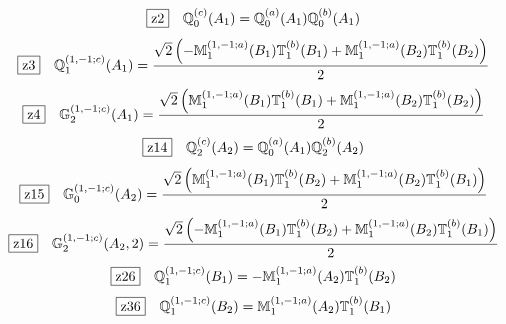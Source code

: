 \documentclass[fleqn,10pt,landscape]{jsarticle}
\begin{document}
\begin{dmath*}
\hspace*{3mm}\fbox{z2}\quad \mathbb{Q}_{0}^{(c)}(A_{1})=\mathbb{Q}_{0}^{(a)}(A_{1}) \mathbb{Q}_{0}^{(b)}(A_{1})
\end{dmath*}
\begin{dmath*}
\hspace*{3mm}\fbox{z3}\quad \mathbb{Q}_{1}^{(1,-1;c)}(A_{1})=\frac{\sqrt{2} \left(- \mathbb{M}_{1}^{(1,-1;a)}(B_{1}) \mathbb{T}_{1}^{(b)}(B_{1}) + \mathbb{M}_{1}^{(1,-1;a)}(B_{2}) \mathbb{T}_{1}^{(b)}(B_{2})\right)}{2}
\end{dmath*}
\begin{dmath*}
\hspace*{3mm}\fbox{z4}\quad \mathbb{G}_{2}^{(1,-1;c)}(A_{1})=\frac{\sqrt{2} \left(\mathbb{M}_{1}^{(1,-1;a)}(B_{1}) \mathbb{T}_{1}^{(b)}(B_{1}) + \mathbb{M}_{1}^{(1,-1;a)}(B_{2}) \mathbb{T}_{1}^{(b)}(B_{2})\right)}{2}
\end{dmath*}
\begin{dmath*}
\hspace*{3mm}\fbox{z14}\quad \mathbb{Q}_{2}^{(c)}(A_{2})=\mathbb{Q}_{0}^{(a)}(A_{1}) \mathbb{Q}_{2}^{(b)}(A_{2})
\end{dmath*}
\begin{dmath*}
\hspace*{3mm}\fbox{z15}\quad \mathbb{G}_{0}^{(1,-1;c)}(A_{2})=\frac{\sqrt{2} \left(\mathbb{M}_{1}^{(1,-1;a)}(B_{1}) \mathbb{T}_{1}^{(b)}(B_{2}) + \mathbb{M}_{1}^{(1,-1;a)}(B_{2}) \mathbb{T}_{1}^{(b)}(B_{1})\right)}{2}
\end{dmath*}
\begin{dmath*}
\hspace*{3mm}\fbox{z16}\quad \mathbb{G}_{2}^{(1,-1;c)}(A_{2},2)=\frac{\sqrt{2} \left(- \mathbb{M}_{1}^{(1,-1;a)}(B_{1}) \mathbb{T}_{1}^{(b)}(B_{2}) + \mathbb{M}_{1}^{(1,-1;a)}(B_{2}) \mathbb{T}_{1}^{(b)}(B_{1})\right)}{2}
\end{dmath*}
\begin{dmath*}
\hspace*{3mm}\fbox{z26}\quad \mathbb{Q}_{1}^{(1,-1;c)}(B_{1})=- \mathbb{M}_{1}^{(1,-1;a)}(A_{2}) \mathbb{T}_{1}^{(b)}(B_{2})
\end{dmath*}
\begin{dmath*}
\hspace*{3mm}\fbox{z36}\quad \mathbb{Q}_{1}^{(1,-1;c)}(B_{2})=\mathbb{M}_{1}^{(1,-1;a)}(A_{2}) \mathbb{T}_{1}^{(b)}(B_{1})
\end{dmath*}
\vspace{5mm}
\end{document}
